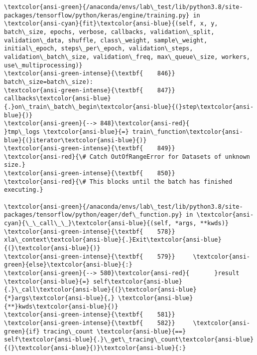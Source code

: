\documentclass[11pt]{article}
\begin{document}
\begin{Verbatim}[commandchars=\\\{\}, frame=single, framerule=2mm, rulecolor=\color{outerrorbackground}]
\textcolor{ansi-green}{/anaconda/envs/lab\_test/lib/python3.8/site-packages/tensorflow/python/keras/engine/training.py} in \textcolor{ansi-cyan}{fit}\textcolor{ansi-blue}{(self, x, y, batch\_size, epochs, verbose, callbacks, validation\_split, validation\_data, shuffle, class\_weight, sample\_weight, initial\_epoch, steps\_per\_epoch, validation\_steps, validation\_batch\_size, validation\_freq, max\_queue\_size, workers, use\_multiprocessing)}
\textcolor{ansi-green-intense}{\textbf{    846}}                 batch\_size=batch\_size):
\textcolor{ansi-green-intense}{\textbf{    847}}               callbacks\textcolor{ansi-blue}{.}on\_train\_batch\_begin\textcolor{ansi-blue}{(}step\textcolor{ansi-blue}{)}
\textcolor{ansi-green}{--> 848}\textcolor{ansi-red}{               }tmp\_logs \textcolor{ansi-blue}{=} train\_function\textcolor{ansi-blue}{(}iterator\textcolor{ansi-blue}{)}
\textcolor{ansi-green-intense}{\textbf{    849}}               \textcolor{ansi-red}{\# Catch OutOfRangeError for Datasets of unknown size.}
\textcolor{ansi-green-intense}{\textbf{    850}}               \textcolor{ansi-red}{\# This blocks until the batch has finished executing.}

\textcolor{ansi-green}{/anaconda/envs/lab\_test/lib/python3.8/site-packages/tensorflow/python/eager/def\_function.py} in \textcolor{ansi-cyan}{\_\_call\_\_}\textcolor{ansi-blue}{(self, *args, **kwds)}
\textcolor{ansi-green-intense}{\textbf{    578}}         xla\_context\textcolor{ansi-blue}{.}Exit\textcolor{ansi-blue}{(}\textcolor{ansi-blue}{)}
\textcolor{ansi-green-intense}{\textbf{    579}}     \textcolor{ansi-green}{else}\textcolor{ansi-blue}{:}
\textcolor{ansi-green}{--> 580}\textcolor{ansi-red}{       }result \textcolor{ansi-blue}{=} self\textcolor{ansi-blue}{.}\_call\textcolor{ansi-blue}{(}\textcolor{ansi-blue}{*}args\textcolor{ansi-blue}{,} \textcolor{ansi-blue}{**}kwds\textcolor{ansi-blue}{)}
\textcolor{ansi-green-intense}{\textbf{    581}} 
\textcolor{ansi-green-intense}{\textbf{    582}}     \textcolor{ansi-green}{if} tracing\_count \textcolor{ansi-blue}{==} self\textcolor{ansi-blue}{.}\_get\_tracing\_count\textcolor{ansi-blue}{(}\textcolor{ansi-blue}{)}\textcolor{ansi-blue}{:}


\end{Verbatim}
\end{document}
